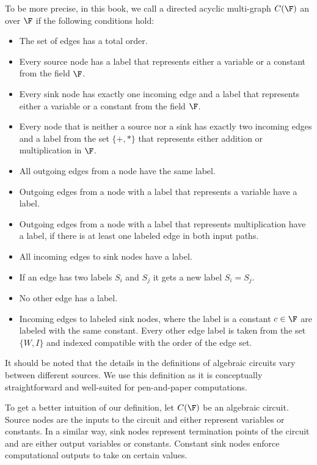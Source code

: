 To be more precise, in this book, we call a directed acyclic multi-graph $C(\F)$  an  over $\F$ if the following conditions hold:

\begin{itemize}
\label{def:algebraic-circuit}
\item The set of edges has a total order.  
\item Every source node has a label that represents either a variable or a constant from the field $\F$.
\item Every sink node has exactly one incoming edge and a label that represents either a variable or a constant from the field $\F$.
\item Every node that is neither a source nor a sink has exactly two incoming edges and a label from the set $\{+,*\}$ that represents either addition or multiplication in $\F$.
\item All outgoing edges from a node have the same label.
\item Outgoing edges from a node with a label that represents a variable have a label.
\item Outgoing edges from a node with a label that represents multiplication have a label, if there is at least one labeled edge in both input paths.
\item All incoming edges to sink nodes have a label.
\item If an edge has two labels $S_i$ and $S_j$ it gets a new label $S_i = S_j$.
\item No other edge has a label.
\item Incoming edges to labeled sink nodes, where the label is a constant $c\in\F$ are labeled with the same constant. Every other edge label is taken from the set $\{W,I\}$ and indexed compatible with the order of the edge set. 
\end{itemize} 

It should be noted that the details in the definitions of algebraic circuits vary between different sources. We use this definition as it is conceptually straightforward and well-suited for pen-and-paper computations.

To get a better intuition of our definition, let $C(\F)$ be an algebraic circuit. Source nodes are the inputs to the circuit and either represent variables or constants. In a similar way, sink nodes represent termination points of the circuit and are either output variables or constants. Constant sink nodes enforce computational outputs to take on certain values.  

